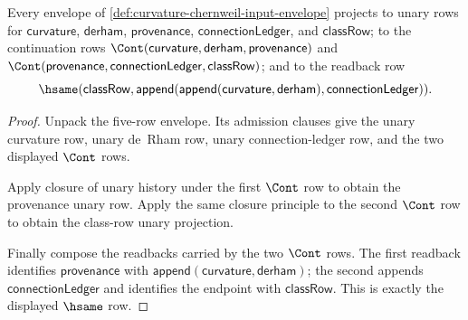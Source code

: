 \begin{theorem}
\label{thm:curvature-chernweil-source-envelope-projection}
Every envelope of \autoref{def:curvature-chernweil-input-envelope} projects to unary rows for $\mathsf{curvature}$, $\mathsf{derham}$, $\mathsf{provenance}$, $\mathsf{connectionLedger}$, and $\mathsf{classRow}$; to the continuation rows $\Cont(\mathsf{curvature},\mathsf{derham},\mathsf{provenance})$ and $\Cont(\mathsf{provenance},\mathsf{connectionLedger},\mathsf{classRow})$; and to the readback row
$$
\hsame(\mathsf{classRow},\mathsf{append}(\mathsf{append}(\mathsf{curvature},\mathsf{derham}),\mathsf{connectionLedger})).
$$
\end{theorem}
\begin{proof}
Unpack the five-row envelope. Its admission clauses give the unary curvature row, unary de~Rham row, unary connection-ledger row, and the two displayed $\Cont$ rows.

Apply closure of unary history under the first $\Cont$ row to obtain the provenance unary row. Apply the same closure principle to the second $\Cont$ row to obtain the class-row unary projection.

Finally compose the readbacks carried by the two $\Cont$ rows. The first readback identifies $\mathsf{provenance}$ with $\mathsf{append}(\mathsf{curvature},\mathsf{derham})$; the second appends $\mathsf{connectionLedger}$ and identifies the endpoint with $\mathsf{classRow}$. This is exactly the displayed $\hsame$ row.
\end{proof}

